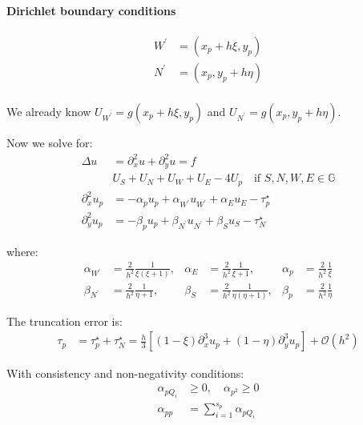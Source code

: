 \paragraph{Dirichlet boundary conditions}
\begin{align*}
  W^\prime & = (x_p + h \xi , y_p) \\
  N^\prime & = (x_p, y_p + h \eta) \\
\end{align*}

We already know \(U_{W^\prime} = g(x_p + h \xi, y_p)\) and \(U_{N^\prime} = g(x_p, y_p + h \eta)\).

Now we solve for:
\begin{align*}
  \Delta u         & = \partial_x^2 u + \partial_y^2 u = f                                         \\
                   & U_S + U_N + U_W + U_E - 4U_p \quad \text{if } S,N,W,E \in \mathbb{G}          \\
  \partial_x^2 u_p & = -\alpha_p u_p + \alpha_{W^\prime}u_{W^\prime} + \alpha_E u_E - \tau_p^\star \\
  \partial_y^2 u_p & = -\beta_p u_p + \beta_{N^\prime}u_{N^\prime} + \beta_S u_S - \tau_N^\star
\end{align*}

where:
\begin{align*}
  \alpha_{W^\prime} & = \frac{2}{h^2}\frac{1}{\xi (\xi + 1)},   &
  \alpha_E          & = \frac{2}{h^2}\frac{1}{\xi + 1},         &
  \alpha_p          & = \frac{2}{h^2}\frac{1}{\xi}                \\
  \beta_{N^\prime}  & = \frac{2}{h^2}\frac{1}{\eta + 1},        &
  \beta_S           & = \frac{2}{h^2}\frac{1}{\eta (\eta + 1)}, &
  \beta_p           & = \frac{2}{h^2}\frac{1}{\eta}
\end{align*}

The truncation error is:
\begin{align*}
  \tau_p & = \tau_p^\star + \tau_N^\star = \frac{h}{3}\left[(1-\xi)\partial_x^3 u_p + (1-\eta)\partial_y^3 u_p\right] + \mathcal{O}(h^2)
\end{align*}

With consistency and non-negativity conditions:
\begin{align*}
  \alpha_{pQ_i} & \geq 0, \quad \alpha_{p^2} \geq 0                  \\
  \alpha_{pp}   & = \sum_{i=1}^{s_p} \alpha_{pQ_i} \tag{consistency}
\end{align*}

